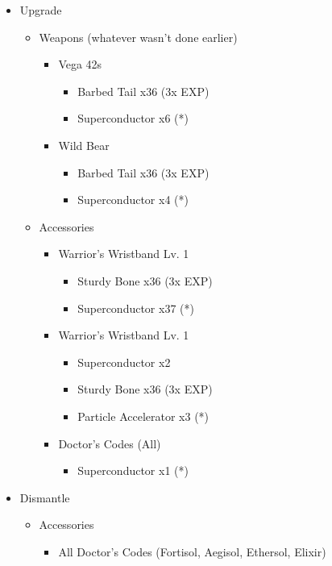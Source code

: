 \begin{multicols}{2}
\begin{upgrade}
\begin{itemize}
    \item Upgrade
    \begin{itemize}
        \item Weapons (whatever wasn't done earlier)
        \begin{itemize}
            \item Vega 42s
            	\begin{itemize}
            		\item Barbed Tail x36 (3x EXP)
            		\item Superconductor x6 (*)
		\end{itemize}
		\item Wild Bear
            	\begin{itemize}
            		\item Barbed Tail x36 (3x EXP)
            		\item Superconductor x4 (*)
		\end{itemize}
		
        \end{itemize}
	\item Accessories
        \begin{itemize}
            \item Warrior's Wristband Lv. 1
            \begin{itemize}
                \item Sturdy Bone x36 (3x EXP)
                \item Superconductor x37 (*)
            \end{itemize}
            \item Warrior's Wristband Lv. 1
            \begin{itemize}
                \item Superconductor x2
                \item Sturdy Bone x36 (3x EXP)
                \item Particle Accelerator x3 (*)
            \end{itemize}
            \item Doctor's Codes (All)
            \begin{itemize}
                \item Superconductor x1 (*)
            \end{itemize}
        \end{itemize}
    \end{itemize}
    \item Dismantle
    \begin{itemize}
        \item Accessories
        \begin{itemize}
            \item All Doctor's Codes (Fortisol, Aegisol, Ethersol, Elixir)
        \end{itemize}
    \end{itemize}
\end{itemize}
\end{upgrade}


\end{multicols}
